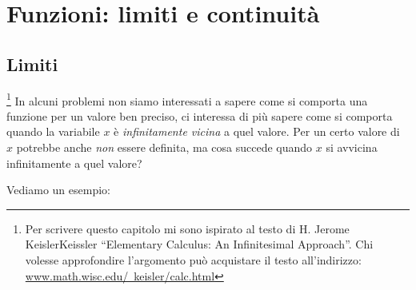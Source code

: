 


\chapter{Funzioni: limiti e continuità}

\section{Limiti}
\label{sec:cont_limiti}

\footnote{Per scrivere questo capitolo mi sono ispirato 
al testo di H. Jerome KeislerKeissler ``Elementary Calculus: An Infinitesimal 
Approach''. 
Chi volesse approfondire l'argomento può acquistare il testo 
all'indirizzo: 
\href{https://www.math.wisc.edu/~keisler/calc.html}
     {www.math.wisc.edu/~keisler/calc.html}}
In alcuni problemi non siamo interessati a sapere come si comporta una funzione 
per un valore ben preciso, ci interessa di più 
sapere come si comporta quando la variabile \(x\) è \emph{infinitamente 
vicina} a quel valore.
Per un certo valore di \(x\) potrebbe anche \emph{non} essere definita, ma 
cosa succede quando \(x\) si avvicina infinitamente a quel valore?

Vediamo un esempio:

